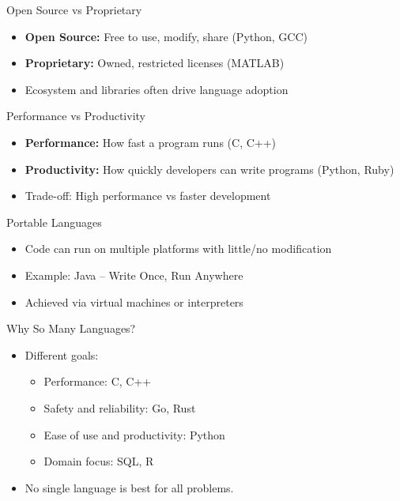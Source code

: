 \documentclass[12pt, aspectratio=169]{beamer}
\begin{document}
    \begin{frame}{Open Source vs Proprietary}
        \begin{itemize}
            \item \textbf{Open Source:} Free to use, modify, share (Python, GCC)
            \item \textbf{Proprietary:} Owned, restricted licenses (MATLAB)
            \item Ecosystem and libraries often drive language adoption
        \end{itemize}
    \end{frame}


    \begin{frame}{Performance vs Productivity}
        \begin{itemize}
            \item \textbf{Performance:} How fast a program runs (C, C++)
            \item \textbf{Productivity:} How quickly developers can write programs (Python, Ruby)
            \item Trade-off: High performance vs faster development
        \end{itemize}
    \end{frame}


    \begin{frame}{Portable Languages}
        \begin{itemize}
            \item Code can run on multiple platforms with little/no modification
            \item Example: Java -- Write Once, Run Anywhere
            \item Achieved via virtual machines or interpreters
        \end{itemize}
    \end{frame}


    \begin{frame}{Why So Many Languages?}
        \begin{itemize}
            \item Different goals:
            \begin{itemize}
                \item Performance: C, C++
                \item Safety and reliability: Go, Rust
                \item Ease of use and productivity: Python
                \item Domain focus: SQL, R
            \end{itemize}
            \item No single language is best for all problems.
        \end{itemize}
    \end{frame}
\end{document}
